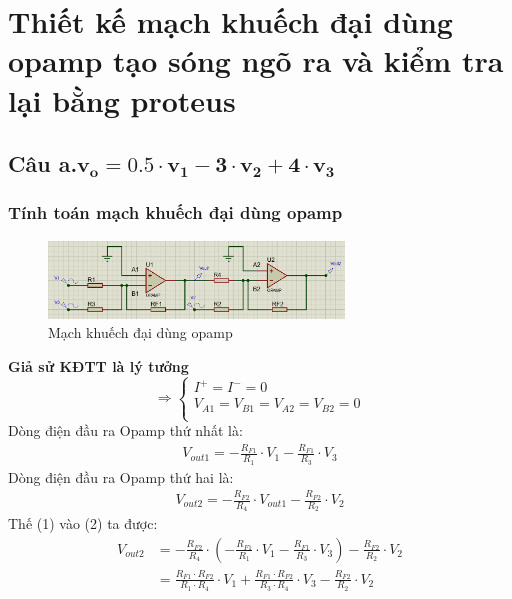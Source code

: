 \section{Thiết kế mạch khuếch đại dùng opamp tạo sóng ngõ ra và kiểm tra lại bằng proteus}	
		\subsection{Câu a.$\mathbf{v_o = 0.5 \cdot v_1 - 3 \cdot v_2 + 4 \cdot v_3}$}
			\subsubsection{Tính toán mạch khuếch đại dùng opamp}
				\begin{figure}[H]
					\centering
					\includegraphics[width=0.7\textwidth]{pictures/topic1_a.png}
					\caption{Mạch khuếch đại dùng opamp}					
					\label{fig:circuit_simulation}
				\end{figure}
				\hspace*{0.6cm}\textbf{Giả sử KĐTT là lý tưởng}
				\[
				\Rightarrow
				\begin{cases}
					I^+ = I^- = 0\\
					V_{A1} = V_{B1} = V_{A2} = V_{B2} = 0\\
				\end{cases}
				\]
				\hspace*{0.6cm}Dòng điện đầu ra Opamp thứ nhất là:
				\begin{align}
					V_{out1} = -\frac{R_{F1}}{R_1} \cdot V_1 - \frac{R_{F1}}{R_3} \cdot V_3 
				\end{align}
				\hspace*{0.6cm}Dòng điện đầu ra Opamp thứ hai là:
				\begin{align}
					V_{out2} = -\frac{R_{F2}}{R_4} \cdot V_{out1} - \frac{R_{F2}}{R_2} \cdot V_2
				\end{align}
				\hspace*{0.6cm}Thế (1) vào (2) ta được: 
				\begin{align*}
					V_{out2} &= -\frac{R_{F2}}{R_4} \cdot \left(-\frac{R_{F1}}{R_1} \cdot V_1 - \frac{R_{F1}}{R_3} \cdot V_3\right) - \frac{R_{F2}}{R_2} \cdot V_2 \\
							&= \frac{R_{F1} \cdot R_{F2}}{R_1 \cdot R_4} \cdot V_1 + \frac{R_{F1} \cdot R_{F2}}{R_3 \cdot R_4} \cdot V_3 - \frac{R_{F2}}{R_2} \cdot V_2
				\end{align*}

